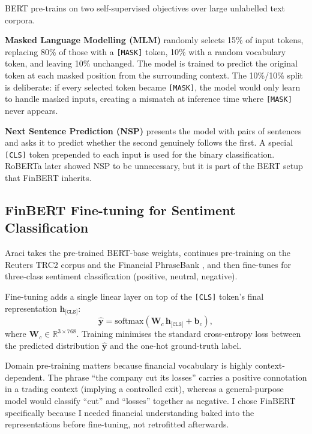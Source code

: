 BERT \citep{devlin2019bert} pre-trains on two self-supervised objectives over large
unlabelled text corpora.

\textbf{Masked Language Modelling (MLM)} randomly selects 15\% of input tokens,
replacing 80\% of those with a \texttt{[MASK]} token, 10\% with a random vocabulary
token, and leaving 10\% unchanged.
The model is trained to predict the original token at each masked position from the
surrounding context.
The 10\%/10\% split is deliberate: if every selected token became \texttt{[MASK]},
the model would only learn to handle masked inputs, creating a mismatch at inference
time where \texttt{[MASK]} never appears.

\textbf{Next Sentence Prediction (NSP)} presents the model with pairs of sentences
and asks it to predict whether the second genuinely follows the first.
A special \texttt{[CLS]} token prepended to each input is used for the binary
classification.
RoBERTa \citep{liu2019roberta} later showed NSP to be unnecessary, but it is part of
the BERT setup that FinBERT inherits.

\subsection{FinBERT Fine-tuning for Sentiment Classification}

Araci \citep{araci2019finbert} takes the pre-trained BERT-base weights, continues
pre-training on the Reuters TRC2 corpus and the Financial PhraseBank
\citep{malo2014financialphrasebank}, and then fine-tunes for three-class sentiment
classification (positive, neutral, negative).

Fine-tuning adds a single linear layer on top of the \texttt{[CLS]} token's final
representation $\mathbf{h}_{\texttt{[CLS]}}$:
\begin{equation}
  \hat{\mathbf{y}}
  = \text{softmax}\!\left(\mathbf{W}_c\,\mathbf{h}_{\texttt{[CLS]}} + \mathbf{b}_c\right),
  \label{eq:finbert_clf}
\end{equation}
where $\mathbf{W}_c \in \mathbb{R}^{3 \times 768}$.
Training minimises the standard cross-entropy loss between the predicted distribution
$\hat{\mathbf{y}}$ and the one-hot ground-truth label.

Domain pre-training matters because financial vocabulary is highly context-dependent.
The phrase ``the company cut its losses'' carries a positive connotation in a trading
context (implying a controlled exit), whereas a general-purpose model would classify
``cut'' and ``losses'' together as negative.
I chose FinBERT specifically because I needed financial understanding baked into the
representations before fine-tuning, not retrofitted afterwards.

